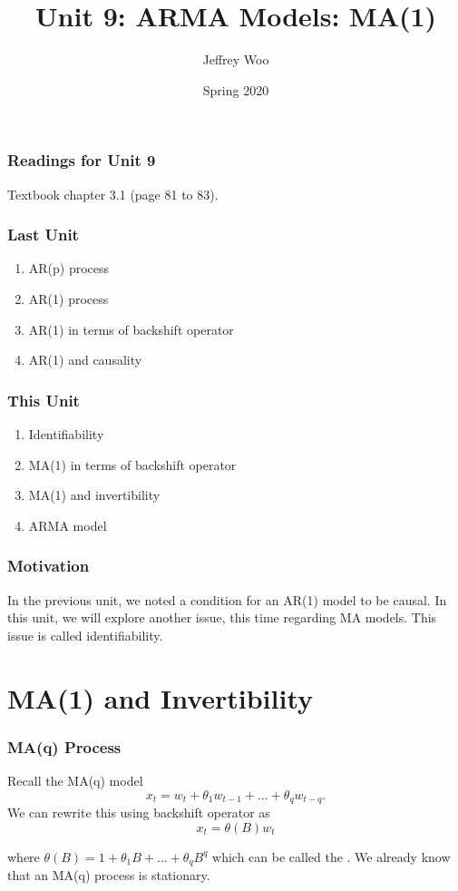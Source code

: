 \documentclass[%
xcolor=pdftex]{beamer}
\title{Unit 9: ARMA Models: MA(1)}
\author[STAT 5170: Applied Time Series, Unit 9]{Jeffrey Woo}
\institute{Department of Statistics, University of Virginia}
\date{Spring 2020}
\begin{document}
\frame{\titlepage}


\begin{frame}
\frametitle{Readings for Unit 9}

Textbook chapter 3.1 (page 81 to 83).

\end{frame}


\begin{frame}
\frametitle{Last Unit}

\begin{enumerate}
\item AR(p) process
\item AR(1) process
\item AR(1) in terms of backshift operator
\item AR(1) and causality
\end{enumerate}

\end{frame}

\begin{frame}
\frametitle{This Unit}
\begin{enumerate}
\item Identifiability
\item MA(1) in terms of backshift operator
\item MA(1) and invertibility
\item ARMA model
\end{enumerate}
\end{frame}

\begin{frame}
\frametitle{Motivation}

In the previous unit, we noted a condition for an AR(1) model to be causal. In this unit, we will explore another issue, this time regarding MA models. This issue is called identifiability.

\end{frame}

\section{MA(1) and Invertibility}
\frame{\tableofcontents[currentsection]}

\begin{frame}
\frametitle{MA(q) Process}

Recall the MA(q) model
$$
x_t=w_t + \theta_1 w_{t-1}+...+ \theta_q w_{t-q}.
$$
We can rewrite this using backshift operator as
\begin{equation} \label{eq:MA}
x_t=\theta(B) w_t
\end{equation}

 where $\theta(B)=1+\theta_1 B+...+\theta_q B^q$ which can be called the \underline{\hspace{45 mm}}. We already know that an MA(q) process is stationary.

\end{frame}
\end{document}
